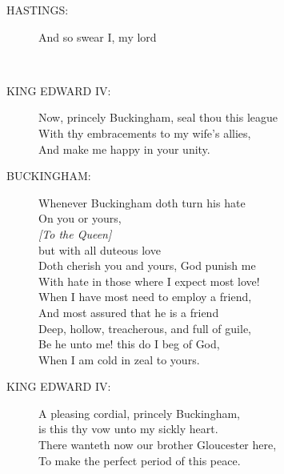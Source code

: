 \documentclass{article}
\begin{document}
\begin{description}
\item[HASTINGS:] 
\hspace{1pt}And so swear I, my lord\\
\end{description}
\\
\begin{description}
\item[KING EDWARD IV:] 
\hspace{1pt}Now, princely Buckingham, seal thou this league\\
\hspace{1pt}With thy embracements to my wife's allies,\\
\hspace{1pt}And make me happy in your unity.\\
\end{description}
\begin{description}
\item[BUCKINGHAM:] 
\hspace{1pt}Whenever Buckingham doth turn his hate\\
\hspace{1pt}On you or yours,\\
{\it [To the Queen]}\\
\hspace{1pt}but with all duteous love\\
\hspace{1pt}Doth cherish you and yours, God punish me\\
\hspace{1pt}With hate in those where I expect most love!\\
\hspace{1pt}When I have most need to employ a friend,\\
\hspace{1pt}And most assured that he is a friend\\
\hspace{1pt}Deep, hollow, treacherous, and full of guile,\\
\hspace{1pt}Be he unto me! this do I beg of God,\\
\hspace{1pt}When I am cold in zeal to yours.\\
\end{description}
\begin{description}
\item[KING EDWARD IV:] 
\hspace{1pt}A pleasing cordial, princely Buckingham,\\
\hspace{1pt}is this thy vow unto my sickly heart.\\
\hspace{1pt}There wanteth now our brother Gloucester here,\\
\hspace{1pt}To make the perfect period of this peace.\\
\end{description}
\end{document}
